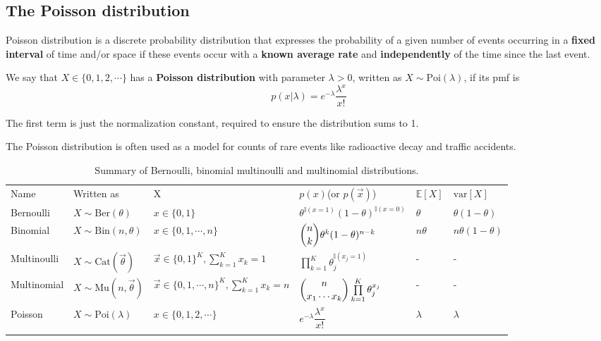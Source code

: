 \subsection{The Poisson distribution}
Poisson distribution is a discrete probability distribution that expresses the probability of a given number of events occurring in a \textbf{fixed interval} of time and/or space if these events occur with a \textbf{known average rate} and \textbf{independently} of the time since the last event.
\begin{definition}
We say that $X \in \{0,1,2,\cdots\}$ has a \textbf{Poisson distribution} with parameter $\lambda>0$, written as $X \sim \text{Poi}(\lambda)$, if its pmf is
\begin{equation}
p(x|\lambda)=e^{-\lambda}\dfrac{\lambda^x}{x!}
\end{equation}
\end{definition}

The first term is just the normalization constant, required to ensure the distribution sums to 1.

The Poisson distribution is often used as a model for counts of rare events like radioactive decay and traffic accidents. 

\begin{table*}
\caption{Summary of Bernoulli, binomial multinoulli and multinomial distributions.}
\label{tab:Summary-distribution}
\centering
\begin{tabular}{llllll}
\hline\noalign{\smallskip}
Name & Written as & X & $p(x)$(or $p(\vec{x})$) & $\mathbb{E}[X]$ & $\text{var}[X]$ \\
\noalign{\smallskip}\svhline\noalign{\smallskip}
Bernoulli & $X \sim \text{Ber}(\theta)$ & $x \in \{0,1\}$ & $\theta^{\mathbb{I}(x=1)}(1-\theta)^{\mathbb{I}(x=0)}$ & $\theta$ & $\theta(1-\theta)$ \\
Binomial & $X \sim \text{Bin}(n,\theta)$ & $x \in \{0,1,\cdots,n\}$ & $\dbinom{n}{k}\theta^k(1-\theta)^{n-k}$ & $n\theta$ & $n\theta(1-\theta)$ \\
Multinoulli & $X \sim \text{Cat}(\vec{\theta})$ & $\vec{x} \in \{0,1\}^K, \sum_{k=1}^K x_k=1$ & $\prod\limits_{k=1}^K\theta_j^{\mathbb{I}(x_j=1)}$ & - & - \\
Multinomial & $X \sim \text{Mu}(n,\vec{\theta})$ & $\vec{x} \in \{0,1,\cdots,n\}^K, \sum_{k=1}^K x_k=n$ & $\dbinom{n}{x_1 \cdots x_k} \prod\limits_{k=1}^K\theta_j^{x_j}$ & - & - \\
Poisson & $X \sim \text{Poi}(\lambda)$ & $x \in \{0,1,2,\cdots\}$ & $e^{-\lambda}\dfrac{\lambda^x}{x!}$ & $\lambda$ & $\lambda$ \\
\noalign{\smallskip}\hline
\end{tabular}
\end{table*}

